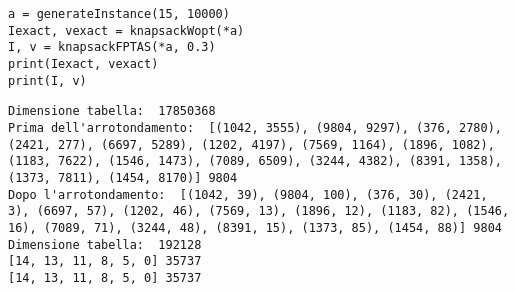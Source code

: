 \begin{verbatim}
a = generateInstance(15, 10000)
Iexact, vexact = knapsackWopt(*a)
I, v = knapsackFPTAS(*a, 0.3)
print(Iexact, vexact)
print(I, v)
\end{verbatim}
\begin{verbatim}
Dimensione tabella:  17850368
Prima dell'arrotondamento:  [(1042, 3555), (9804, 9297), (376, 2780),
(2421, 277), (6697, 5289), (1202, 4197), (7569, 1164), (1896, 1082),
(1183, 7622), (1546, 1473), (7089, 6509), (3244, 4382), (8391, 1358),
(1373, 7811), (1454, 8170)] 9804
Dopo l'arrotondamento:  [(1042, 39), (9804, 100), (376, 30), (2421,
3), (6697, 57), (1202, 46), (7569, 13), (1896, 12), (1183, 82), (1546,
16), (7089, 71), (3244, 48), (8391, 15), (1373, 85), (1454, 88)] 9804
Dimensione tabella:  192128
[14, 13, 11, 8, 5, 0] 35737
[14, 13, 11, 8, 5, 0] 35737
\end{verbatim}

